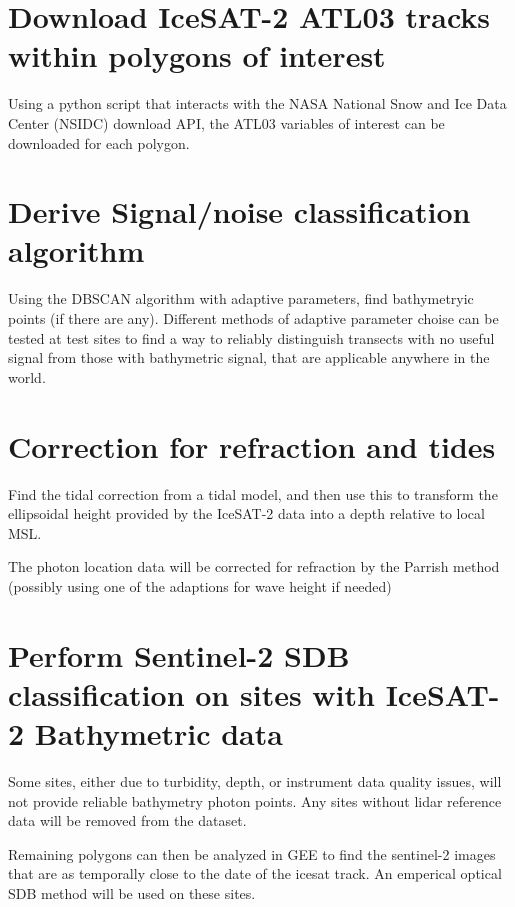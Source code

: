 \section{Download IceSAT-2 ATL03 tracks within polygons of interest}
Using a python script that interacts with the NASA National Snow and Ice Data Center (NSIDC) download API, the ATL03 variables of interest can be downloaded for each polygon. 

\section{Derive Signal/noise classification algorithm}
Using the DBSCAN algorithm with adaptive parameters, find bathymetryic points (if there are any). Different methods of adaptive parameter choise can be tested at test sites to find a way to reliably distinguish transects with no useful signal from those with bathymetric signal, that are applicable anywhere in the world.

\section{Correction for refraction and tides}
Find the tidal correction from a tidal model, and then use this to transform the ellipsoidal height provided by the IceSAT-2 data into a depth relative to local MSL.

The photon location data will be corrected for refraction by the Parrish method (possibly using one of the adaptions for wave height if needed)

\section{Perform Sentinel-2 SDB classification on sites with IceSAT-2 Bathymetric data}
Some sites, either due to turbidity, depth, or instrument data quality issues, will not provide reliable bathymetry photon points. Any sites without lidar reference data will be removed from the dataset. 

Remaining polygons can then be analyzed in GEE to find the sentinel-2 images that are as temporally close to the date of the icesat track. An emperical optical SDB method will be used on these sites. 


